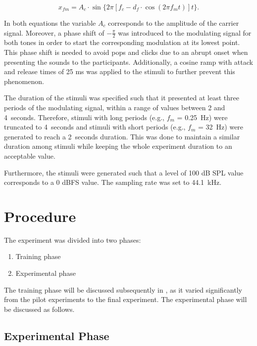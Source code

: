 \documentclass[../main.tex]{subfiles}
\begin{document}
\begin{equation}
  x_{fm} = A_c \cdot \sin \{2 \pi [f_c - d_f \cdot \cos(2 \pi f_m t)] t \}.
  \label{eq:fm}
\end{equation}

In both equations the variable $A_c$ corresponds to the amplitude of the
carrier signal. Moreover, a phase shift of $-\frac{\pi}{2}$ was introduced to
the modulating signal for both tones in order to start the corresponding
modulation at its lowest point. This phase shift is needed to avoid pops and
clicks due to an abrupt onset when presenting the sounds to the participants.
Additionally, a cosine ramp with attack and release times of 25 ms was applied
to the stimuli to further prevent this phenomenon.

The duration of the stimuli was specified such that it presented at least three
periods of the modulating signal, within a range of values between 2 and
4~seconds. Therefore, stimuli with long periods (e.g., $f_m$ = 0.25~Hz) were
truncated to 4~seconds and stimuli with short periods (e.g., $f_m$ = 32~Hz) were
generated to reach a 2~seconds duration. This was done to maintain a similar
duration among stimuli while keeping the whole experiment duration to an
acceptable value.

Furthermore, the stimuli were generated such that a level of 100 dB SPL value
corresponds to a 0 dBFS value. The sampling rate was set to 44.1~kHz.

\section{Procedure}
\label{sec:procedure}

The experiment was divided into two phases:
\begin{enumerate}
  \item Training phase
  \item Experimental phase
\end{enumerate}

The training phase will be discussed subsequently in
, as it varied significantly from the pilot
experiments to the final experiment. The experimental phase will be discussed
as follows.

\subsection{Experimental Phase}

\end{document}
